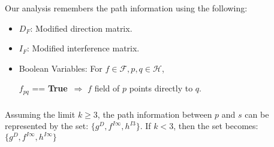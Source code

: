 \documentclass[mathserif,10pt]{beamer}
\newcommand{\cmt}[1]{}
\newcommand{\p}{\ensuremath{p}}
\newcommand{\q}{\ensuremath{q}}
\newcommand{\s}{\ensuremath{s}}
\newcommand{\drct}{\ensuremath{D}}
\newcommand{\indrct}{\ensuremath{I}}
\newcommand{\heap}{\ensuremath{\mathcal{H}}}
\newcommand{\fields}{\ensuremath{\mathcal{F}}}
\newcommand{\true}{\textbf{True}}
\begin{document}
{{	Our analysis remembers the path information using the following:
	\begin{itemize}
	\item  {\blue $D_F$}: Modified direction matrix. \cmt{ that stores the first fields of the paths between two pointers.}
	\pause
	\item {\blue $I_F$}: Modified interference matrix. \cmt{ that stores the pairs of first fields corresponding to the pairs of interfering paths.}
	\pause
	\item {\blue Boolean Variables}: For $f \in \fields, \p, \q \in \heap$, \\ 
			\begin{center}
			$f_{pq}$ == \true\ $ \Rightarrow$  $f$ field of $\p$ points directly to $\q$. 
			\end{center}
	
	\cmt{Field connectivity information: Remember the fields directly connecting two pointer variables.}
	\end{itemize}
}

\cmt{ NOT INCLUDED
\subsection{Notion of Path}
\frame
{
	\frametitle{\subsecname}
	\begin{itemize}
	\item A path from $\p$ to $\q$ is the sequence of pointer fields that need to be traversed in 
			the heap to reach from $\p$ to $\q$.
	\item Path length may be unbounded, so we consider only the first field of a path.
	\item For a path of length one (direct path) ($f_\drct$); For a path of length greater than one
			(indirect path) ($f_\indrct$).
	\item Possible to have multiple indirect paths starting with the same field : k-limiting, beyond k treat the number 
			of paths to be $\infty$.
	\end{itemize}
}
}

\frame
{
	\frametitle{\subsecname}
	
	Assuming the limit $k \geq 3$, the path information between $\p$ and $\s$ can be represented by the set:
	$\{g^\drct, f^{\indrct\infty}, h^{\indrct 3} \}$. 
	If $k < 3$, then the set becomes: 
	$\{ g^\drct, f^{\indrct\infty}, h^{\indrct\infty} \}$
}

\cmt{ NOT INCLUDED
}}
\end{document}
